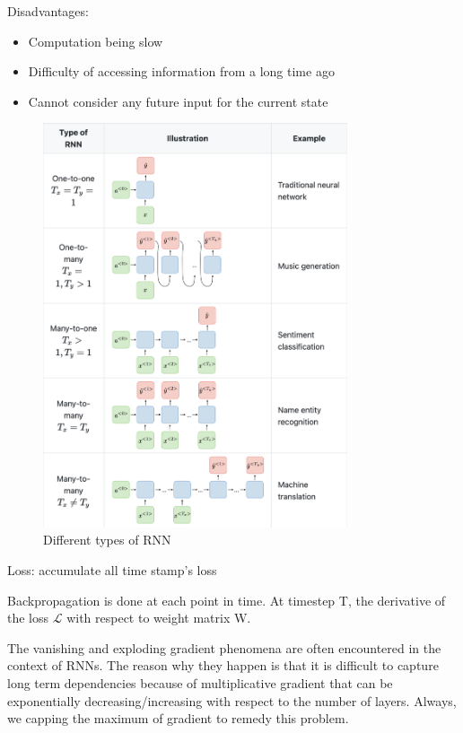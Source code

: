 \documentclass[UTF8]{article}
\begin{document}
Disadvantages:\\
\begin{itemize}
    \item Computation being slow
    \item Difficulty of accessing information from a long time ago
    \item Cannot consider any future input for the current state
\end{itemize}

\begin{figure}[htbp]
\caption{Different types of RNN}
\centering
\includegraphics[width=0.8\textwidth]{stanford.edu__shervine_teaching_cs-230_cheatsheet-recurrent-neural-networks.png}
\end{figure}

Loss: accumulate all time stamp's loss

Backpropagation is done at each point in time. At timestep T, the derivative of the loss $\mathcal{L}$ with respect to weight matrix W.

The vanishing and exploding gradient phenomena are often encountered in the context of RNNs. The reason why they happen is that it is difficult to capture long term dependencies because of multiplicative gradient that can be exponentially decreasing/increasing with respect to the number of layers. Always, we capping the maximum of gradient to remedy this problem.
\end{document}
